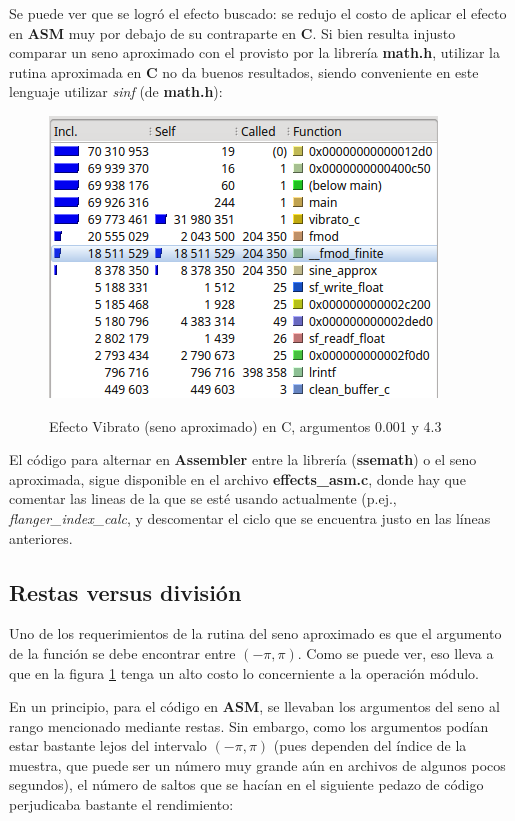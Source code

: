 Se puede ver que se logró el efecto buscado: se redujo el costo de aplicar el efecto en \textbf{ASM} muy por debajo de su contraparte en \textbf{C}. Si bien resulta injusto comparar un seno aproximado con el provisto por la librería \textbf{math.h}, utilizar la rutina aproximada en \textbf{C} no da buenos resultados, siendo conveniente en este lenguaje utilizar \textit{sinf} (de \textbf{math.h}):

\begin{figure}[H]
    \centering
    \includegraphics[scale=0.8]{imagenes/callgrind-c-seno-approx.png}
    \label{fig:callgrind-asm-27512}
    \caption{Efecto Vibrato (seno aproximado) en C, argumentos 0.001 y 4.3}
\end{figure}

El código para alternar en \textbf{Assembler} entre la librería (\textbf{ssemath}) o el seno aproximada, sigue disponible en el archivo \textbf{effects\_asm.c}, donde hay que comentar las lineas de la que se esté usando actualmente (p.ej., \textit{flanger\_index\_calc}, y descomentar el ciclo que se encuentra justo en las líneas anteriores.

\subsection{Restas versus división}
\label{subsec:desarrollo-problemas-modulo}
Uno de los requerimientos de la rutina del seno aproximado es que el argumento de la función se debe encontrar entre $(-\pi,\pi)$. Como se puede ver, eso lleva a que en la figura \ref{fig:callgrind-asm-27512} tenga un alto costo lo concerniente a la operación módulo. 

En un principio, para el código en \textbf{ASM}, se llevaban los argumentos del seno al rango mencionado mediante restas. Sin embargo, como los argumentos podían estar bastante lejos del intervalo $(-\pi, \pi)$ (pues dependen del índice de la muestra, que puede ser un número muy grande aún en archivos de algunos pocos segundos), el número de saltos que se hacían en el siguiente pedazo de código perjudicaba bastante el rendimiento:\vspace{\baselineskip}

